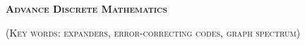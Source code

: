 


\thispagestyle{empty}

\centerline{\large \textsc{\textbf{Advance Discrete Mathematics}}}
\centerline{\small \textsc{(Key words: expanders, error-correcting codes, graph spectrum)}}

\bigskip



\vspace{1cm}

%    

\nocite{*}
%
%
\printbibliography



